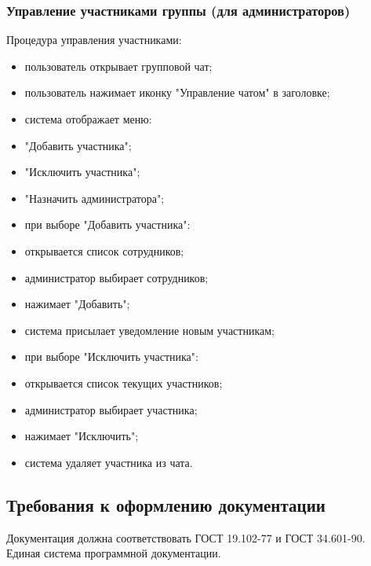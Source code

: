 
\subsubsection{Управление участниками группы (для администраторов)}  
Процедура управления участниками:  
\begin{itemize}  
	\item пользователь открывает групповой чат;  
	\item пользователь нажимает иконку "Управление чатом" в заголовке;  
	\item система отображает меню:  
		\item "Добавить участника";  
		\item "Исключить участника";  
		\item "Назначить администратора";   
	\item при выборе "Добавить участника":  
		\item открывается список сотрудников;  
		\item администратор выбирает сотрудников;  
		\item нажимает "Добавить";  
		\item система присылает уведомление новым участникам;  
	\item при выборе "Исключить участника":   
		\item открывается список текущих участников;  
		\item администратор выбирает участника;  
		\item нажимает "Исключить";  
		\item система удаляет участника из чата.  
\end{itemize}  

\subsection{Требования к оформлению документации}

Документация должна соответствовать ГОСТ 19.102-77 и ГОСТ 34.601-90. Единая система программной документации.